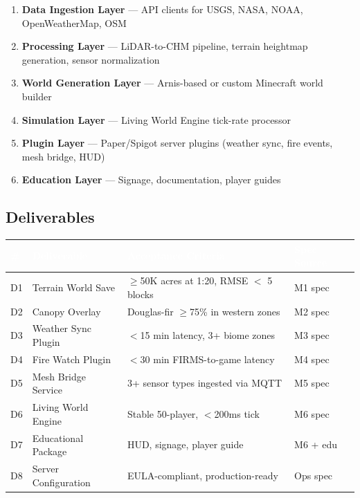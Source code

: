 \documentclass[11pt,letterpaper]{article}
\newcommand{\tableheader}[1]{\textbf{\sffamily\textcolor{white}{#1}}}
\begin{document}
\begin{enumerate}[nosep]
  \item \textbf{Data Ingestion Layer} --- API clients for USGS, NASA, NOAA, OpenWeatherMap, OSM
  \item \textbf{Processing Layer} --- LiDAR-to-CHM pipeline, terrain heightmap generation, sensor normalization
  \item \textbf{World Generation Layer} --- Arnis-based or custom Minecraft world builder
  \item \textbf{Simulation Layer} --- Living World Engine tick-rate processor
  \item \textbf{Plugin Layer} --- Paper/Spigot server plugins (weather sync, fire events, mesh bridge, HUD)
  \item \textbf{Education Layer} --- Signage, documentation, player guides
\end{enumerate}

\subsection{Deliverables}

\begin{center}
\begin{tabularx}{\textwidth}{C{0.6cm}L{3.5cm}XL{2.8cm}}
\toprule
{}
\tableheader{\#} & \tableheader{Deliverable} & \tableheader{Acceptance Criteria} & \tableheader{Spec Source} \\
\midrule
D1 & Terrain World Save & $\geq$50K acres at 1:20, RMSE $<$ 5 blocks & M1 spec \\
D2 & Canopy Overlay & Douglas-fir $\geq$75\% in western zones & M2 spec \\
D3 & Weather Sync Plugin & $<$15 min latency, 3+ biome zones & M3 spec \\
D4 & Fire Watch Plugin & $<$30 min FIRMS-to-game latency & M4 spec \\
D5 & Mesh Bridge Service & 3+ sensor types ingested via MQTT & M5 spec \\
D6 & Living World Engine & Stable 50-player, $<$200ms tick & M6 spec \\
D7 & Educational Package & HUD, signage, player guide & M6 + edu \\
D8 & Server Configuration & EULA-compliant, production-ready & Ops spec \\
\bottomrule
\end{tabularx}
\end{center}
\end{document}
